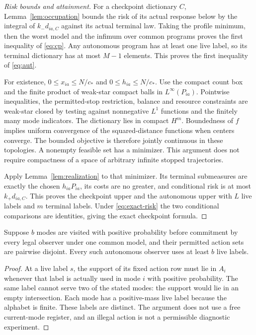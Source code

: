 \begin{proof}[Risk bounds and attainment]
For a checkpoint dictionary $C$, Lemma~\ref{lem:occupation} bounds the risk of its actual response below by the integral of $k_-d_{ia,C}$ against its actual terminal law. Taking the profile minimum, then the worst model and the infimum over common programs proves the first inequality of \eqref{eq:cp}. Any autonomous program has at least one live label, so its terminal dictionary has at most $M-1$ elements. This proves the first inequality of \eqref{eq:aut}.

For existence, $0\le x_{ia}\le N/c_*$ and $0\le h_{ia}\le N/c_*$. Use the compact count box and the finite product of weak-star compact balls in $L^\infty(P_{ia})$. Pointwise inequalities, the permitted-stop restriction, balance and resource constraints are weak-star closed by testing against nonnegative $L^1$ functions and the finitely many mode indicators. The dictionary lies in compact $H^m$. Boundedness of $f$ implies uniform convergence of the squared-distance functions when centers converge. The bounded objective is therefore jointly continuous in these topologies. A nonempty feasible set has a minimizer. This argument does not require compactness of a space of arbitrary infinite stopped trajectories.

Apply Lemma~\ref{lem:realization} to that minimizer. Its terminal submeasures are exactly the chosen $h_{ia}P_{ia}$, its costs are no greater, and conditional risk is at most $k_+d_{ia,C}$. This proves the checkpoint upper and the autonomous upper with $L$ live labels and $m$ terminal labels. Under \eqref{eq:exact-risk} the two conditional comparisons are identities, giving the exact checkpoint formula.
\end{proof}

\begin{lemma}\label{lem:labels}
Suppose $b$ modes are visited with positive probability before commitment by every legal observer under one common model, and their permitted action sets are pairwise disjoint. Every such autonomous observer uses at least $b$ live labels.
\end{lemma}
\begin{proof}
At a live label $s$, the support of its fixed action row must lie in $A_i$ whenever that label is actually used in mode $i$ with positive probability. The same label cannot serve two of the stated modes: the support would lie in an empty intersection. Each mode has a positive-mass live label because the alphabet is finite. These labels are distinct. The argument does not use a free current-mode register, and an illegal action is not a permissible diagnostic experiment.
\end{proof}

